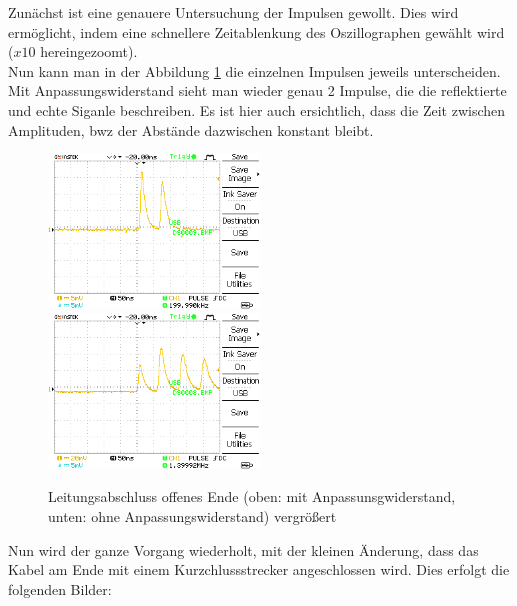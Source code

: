 \documentclass{article}
\begin{document}
               
                \clearpage
                Zunächst ist eine genauere Untersuchung der Impulsen gewollt. Dies wird ermöglicht, indem eine schnellere Zeitablenkung 
                des Oszillographen gewählt wird ($x10$ hereingezoomt). \\
                Nun kann man in der Abbildung \ref*{fig:DS0009.8} die 
                einzelnen Impulsen jeweils unterscheiden. Mit Anpassungswiderstand sieht man wieder genau 2 Impulse, die die 
                reflektierte und echte Siganle beschreiben. Es ist hier auch ersichtlich, dass die Zeit zwischen Amplituden, 
                bwz der Abstände dazwischen konstant bleibt. 
				\begin{figure}[H]
					\centering
					\includegraphics[width=0.5\textwidth]{MesswerteVersuch1/DS0009.png}
					\includegraphics[width=0.5\textwidth]{MesswerteVersuch1/DS0008.png}
					\caption{Leitungsabschluss offenes Ende (oben: mit Anpassunsgwiderstand, unten: ohne Anpassungswiderstand) vergrößert}
					\label{fig:DS0009.8}
				\end{figure}

                \clearpage 

        Nun wird der ganze Vorgang wiederholt, mit der kleinen Änderung, dass das 
                Kabel am Ende mit einem Kurzchlussstrecker angeschlossen wird. Dies erfolgt 
                die folgenden Bilder:  
                
\end{document}
